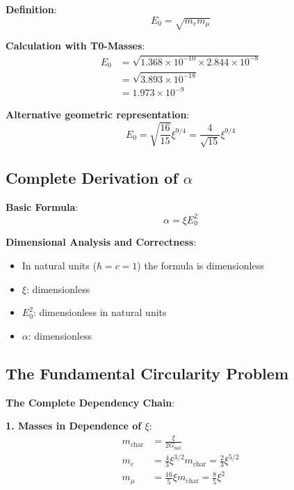 \documentclass[12pt,a4paper]{article}
\newcommand{\xipar}{\xi}
\newcommand{\alphagem}{\alpha}
\newcommand{\mchar}{m_{\text{char}}}
\newcommand{\Ezero}{E_0}
\begin{document}
	\textbf{Definition}:
	\begin{equation}
		\Ezero = \sqrt{m_e m_\mu}
	\end{equation}
	
	\textbf{Calculation with T0-Masses}:
	\begin{align}
		\Ezero &= \sqrt{1{.}368 \times 10^{-10} \times 2{.}844 \times 10^{-8}} \\
		&= \sqrt{3{.}893 \times 10^{-18}} \\
		&= 1{.}973 \times 10^{-9}
	\end{align}
	
	\textbf{Alternative geometric representation}:
	\begin{equation}
		\Ezero = \sqrt{\frac{16}{15}} \xipar^{9/4} = \frac{4}{\sqrt{15}} \xipar^{9/4}
	\end{equation}
	
	\subsection{Complete Derivation of $\alphagem$}
	
	\textbf{Basic Formula}:
	\begin{equation}
		\alphagem = \xipar \Ezero^2
	\end{equation}
	
	\textbf{Dimensional Analysis and Correctness}:
	\begin{itemize}
		\item In natural units ($\hbar = c = 1$) the formula is dimensionless
		\item $\xipar$: dimensionless
		\item $\Ezero^2$: dimensionless in natural units
		\item $\alphagem$: dimensionless
	\end{itemize}
	
	\subsection{The Fundamental Circularity Problem}
	
	\textbf{The Complete Dependency Chain}:
	
	\textbf{1. Masses in Dependence of $\xipar$}:
	\begin{align}
		\mchar &= \frac{\xipar}{2G_{\text{nat}}} \\
		m_e &= \frac{4}{3} \xipar^{3/2} \mchar = \frac{2}{3} \xipar^{5/2} \\
		m_\mu &= \frac{16}{5} \xipar \mchar = \frac{8}{5} \xipar^2
	\end{align}
	
\end{document}
